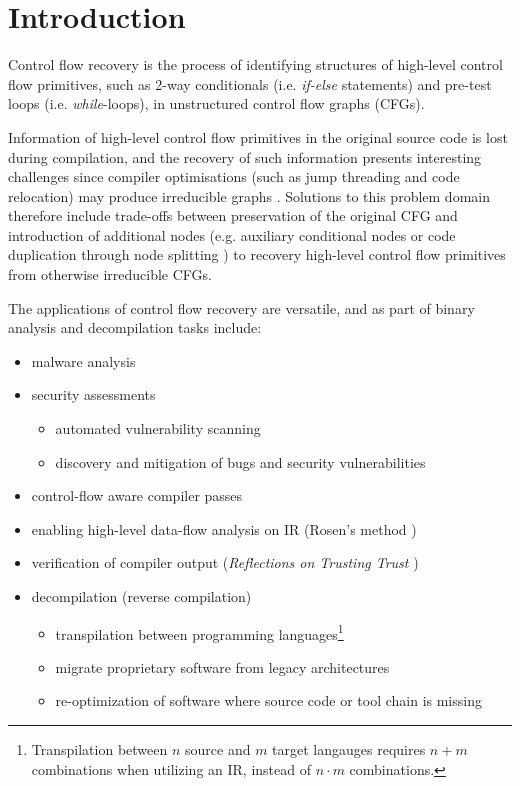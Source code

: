 
\section{Introduction}

Control flow recovery is the process of identifying structures of high-level control flow primitives, such as 2-way conditionals (i.e. \textit{if-else} statements) and pre-test loops (i.e. \textit{while}-loops), in unstructured control flow graphs (CFGs).

Information of high-level control flow primitives in the original source code is lost during compilation, and the recovery of such information presents interesting challenges since compiler optimisations (such as jump threading and code relocation) may produce irreducible graphs \cite{cifuentes_reverse_comp}. Solutions to this problem domain therefore include trade-offs between preservation of the original CFG and introduction of additional nodes (e.g. auxiliary conditional nodes \cite{no_more_gotos} or code duplication through node splitting \cite{node_splitting}) to recovery high-level control flow primitives from otherwise irreducible CFGs.

The applications of control flow recovery are versatile, and as part of binary analysis and decompilation tasks include:

\begin{itemize}
	\item malware analysis
	\item security assessments
	\begin{itemize}
		\item automated vulnerability scanning
		\item discovery and mitigation of bugs and security vulnerabilities
	\end{itemize}
	\item control-flow aware compiler passes
	\item enabling high-level data-flow analysis on IR (Rosen's method \cite{rosen_method,advanced_compiler_design_implementation_book})
	\item verification of compiler output (\textit{Reflections on Trusting Trust} \cite{trusting_trust})
	\item decompilation (reverse compilation)
	\begin{itemize}
		\item transpilation between programming languages\footnote{Transpilation between $n$ source and $m$ target langauges requires $n + m$ combinations when utilizing an IR, instead of $n \cdot m$ combinations.}
		\item migrate proprietary software from legacy architectures
		\item re-optimization of software where source code or tool chain is missing
	\end{itemize}
\end{itemize}





